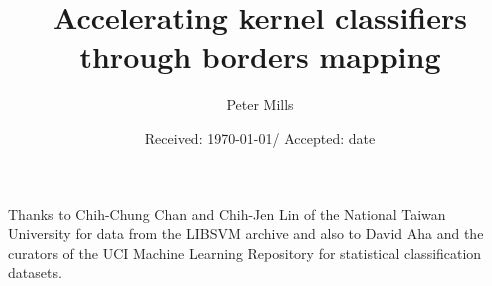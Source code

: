 \title{Accelerating kernel classifiers through borders mapping}


\author{Peter Mills}



\date{Received: \today / Accepted: date}


\maketitle

\begin{abstract}
	
\end{abstract}



\appendix

%


\begin{acknowledgements}
Thanks to Chih-Chung Chan and Chih-Jen Lin of the National Taiwan University
for data from the LIBSVM archive and also to David Aha and the curators of
the UCI Machine Learning Repository for statistical classification datasets.
\end{acknowledgements}


%



